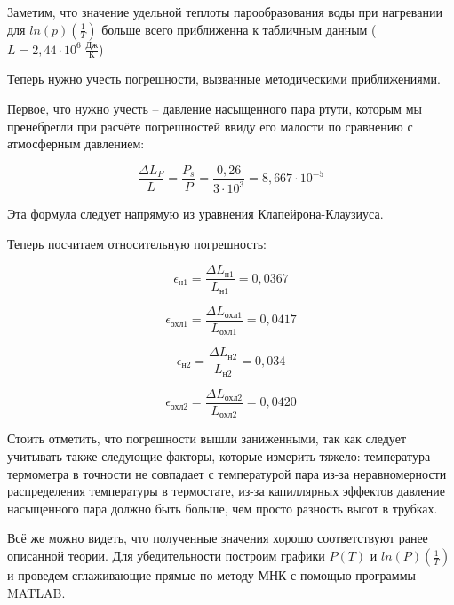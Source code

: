\documentclass[a4paper,11.5pt]{article} %
\begin{document}
Заметим, что значение удельной теплоты парообразования воды при нагревании для $ln(p)(\frac{1}{T})$ больше всего приближенна к табличным данным ($L = 2,44 \cdot 10^6 \; \frac{\text{Дж}}{\text{К}}$)

Теперь нужно учесть погрешности, вызванные методическими приближениями. 

Первое, что нужно учесть -- давление насыщенного пара ртути, которым мы пренебрегли при расчёте погрешностей ввиду его малости по сравнению с атмосферным давлением:

\begin{equation}
	\frac{\Delta L_P  }{L} = \frac{P_s}{P} = \frac{0,26}{3 \cdot 10^3} = 8,667 \cdot 10^{-5}
\end{equation}

Эта формула следует напрямую из уравнения Клапейрона-Клаузиуса.

Теперь посчитаем относительную погрешность:

\begin{equation}
	\epsilon_{\text{н1}} = \frac{\Delta L_{\text{н1}}}{L_{\text{н1}}} = 0,0367
\end{equation}

\begin{equation}
	\epsilon_{\text{охл1}} = \frac{\Delta L_{\text{охл1}}}{L_{\text{охл1}}} = 0,0417
\end{equation}

\begin{equation}
	\epsilon_{\text{н2}} = \frac{\Delta L_{\text{н2}}}{L_{\text{н2}}} = 0,034
\end{equation}

\begin{equation}
	\epsilon_{\text{охл2}} = \frac{\Delta L_{\text{охл2}}}{L_{\text{охл2}}} = 0,0420
\end{equation}


Стоить отметить, что погрешности вышли заниженными, так как следует учитывать также следующие факторы, которые измерить тяжело: температура термометра в точности не совпадает с температурой пара из-за неравномерности распределения температуры в термостате, из-за капиллярных эффектов давление насыщенного пара должно быть больше, чем просто разность высот в трубках.

Всё же можно видеть, что полученные значения хорошо соответствуют ранее описанной теории. Для убедительности построим графики $P(T)$ и $ln(P)\left( \frac{1}{T}\right)$ и проведем сглаживающие прямые по методу МНК с помощью программы MATLAB.
\end{document}
